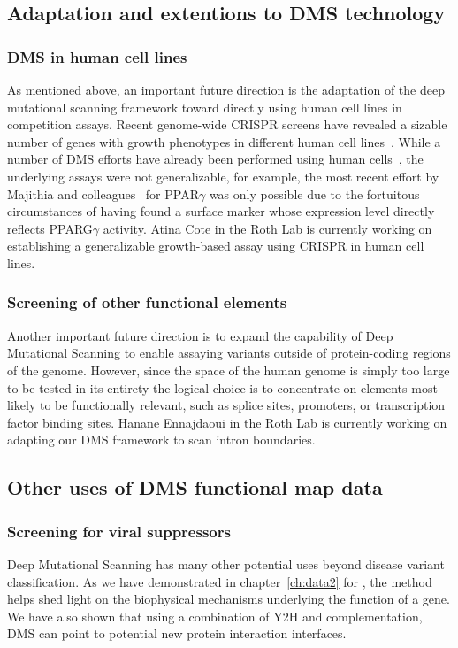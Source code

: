 \subsection{Adaptation and extentions to DMS technology}
\subsubsection{DMS in human cell lines}
As mentioned above, an important future direction is the adaptation of the deep mutational scanning framework toward directly using human cell lines in competition assays. Recent genome-wide CRISPR screens have revealed a sizable number of genes with growth phenotypes in different human cell lines~\cite{hart_high-resolution_2015,blomen_gene_2015,wang_genetic_2014}. While a number of DMS efforts have already been performed using human cells~\cite{forsyth_deep_2013,wagenaar_resistance_2014,doud_site-specific_2015,majithia_prospective_2016}, the underlying assays were not generalizable, for example, the most recent effort by Majithia and colleagues~\cite{majithia_prospective_2016} for PPAR$\gamma$ was only possible due to the fortuitous circumstances of having found a surface marker whose expression level directly reflects PPARG$\gamma$ activity. 
Atina Cote in the Roth Lab is currently working on establishing a generalizable growth-based assay using CRISPR in human cell lines. 

\subsubsection{Screening of other functional elements}
Another important future direction is to expand the capability of Deep Mutational Scanning to enable assaying variants outside of protein-coding regions of the genome. However, since the space of the human genome is simply too large to be tested in its entirety the logical choice is to concentrate on elements most likely to be functionally relevant, such as splice sites, promoters, or transcription factor binding sites.
Hanane Ennajdaoui in the Roth Lab is currently working on adapting our DMS framework to scan intron boundaries.

\subsection{Other uses of DMS functional map data}

\subsubsection{Screening for viral suppressors}
Deep Mutational Scanning has many other potential uses beyond disease variant classification. As we have demonstrated in chapter~\ref{ch:data2} for , the method helps shed light on the biophysical mechanisms underlying the function of a gene. We have also shown that using a combination of Y2H and complementation, DMS can point to potential new protein interaction interfaces. 

